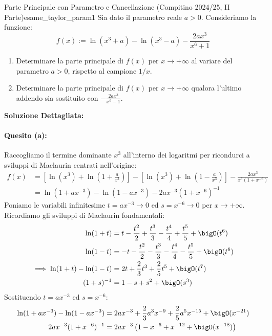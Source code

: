 \begin{esempio}{Parte Principale con Parametro e Cancellazione (Compitino 2024/25, II Parte)}{esame_taylor_param1}
Sia dato il parametro reale $a > 0$. Consideriamo la funzione:
\[
    f(x) := \ln(x^3 + a) - \ln(x^3 - a) - \frac{2ax^3}{x^6 + 1}
\]
\begin{enumerate}[label=\alph*)]
    \item Determinare la parte principale di $f(x)$ per $x \to +\infty$ al variare del parametro $a > 0$, rispetto al campione $1/x$.
    \item Determinare la parte principale di $f(x)$ per $x \to +\infty$ qualora l'ultimo addendo sia sostituito con $-\frac{2ax^3}{x^6 - 1}$.
\end{enumerate}
\tcblower
\textbf{Soluzione Dettagliata:}

\paragraph{Quesito (a):} Raccogliamo il termine dominante $x^3$ all'interno dei logaritmi per ricondurci a sviluppi di Maclaurin centrati nell'origine:
\begin{align*}
    f(x) &= \left[ \ln(x^3) + \ln\left(1 + \frac{a}{x^3}\right) \right] - \left[ \ln(x^3) + \ln\left(1 - \frac{a}{x^3}\right) \right] - \frac{2ax^3}{x^6\left(1 + x^{-6}\right)} \\
    &= \ln\left(1 + ax^{-3}\right) - \ln\left(1 - ax^{-3}\right) - 2ax^{-3}\left(1 + x^{-6}\right)^{-1}
\end{align*}
Poniamo le variabili infinitesime $t = ax^{-3} \to 0$ ed $s = x^{-6} \to 0$ per $x \to +\infty$.
Ricordiamo gli sviluppi di Maclaurin fondamentali:
\begin{align*}
    \ln(1 + t) &= t - \frac{t^2}{2} + \frac{t^3}{3} - \frac{t^4}{4} + \frac{t^5}{5} + \bigO(t^6) \\
    \ln(1 - t) &= -t - \frac{t^2}{2} - \frac{t^3}{3} - \frac{t^4}{4} - \frac{t^5}{5} + \bigO(t^6) \\
    \implies \ln(1+t) - \ln(1-t) &= 2t + \frac{2}{3}t^3 + \frac{2}{5}t^5 + \bigO(t^7) \\
    (1 + s)^{-1} &= 1 - s + s^2 + \bigO(s^3)
\end{align*}
Sostituendo $t = ax^{-3}$ ed $s = x^{-6}$:
\begin{align*}
    \ln(1 + ax^{-3}) - \ln(1 - ax^{-3}) &= 2ax^{-3} + \frac{2}{3}a^3 x^{-9} + \frac{2}{5}a^5 x^{-15} + \bigO(x^{-21}) \\
    2ax^{-3}(1 + x^{-6})^{-1} &= 2ax^{-3}\left(1 - x^{-6} + x^{-12} + \bigO(x^{-18})\right) \\

\end{align*}
\end{esempio}
